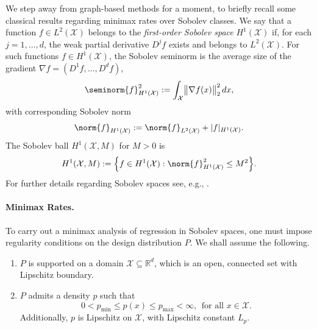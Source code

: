 \documentclass[twoside]{article}
\newcommand{\Reals}{\mathbb{R}}
\newcommand{\1}{\mathbf{1}}
\newcommand{\Rd}{\Reals^d}
\newcommand{\Xset}{\mathcal{X}}
\newcommand{\Leb}{L}
\theoremstyle{definition}
\theoremstyle{remark}
\begin{document}
We step away from graph-based methods for a moment, to briefly recall some classical results regarding minimax rates over Sobolev classes. We say that a function $f \in \Leb^2(\Xset)$ belongs to the \emph{first-order Sobolev space} $H^1(\Xset)$ if, for each $j = 1,\ldots,d$, the weak partial derivative $D^j f$ exists and belongs to $\Leb^2(\Xset)$. For such functions $f \in H^1(\Xset)$, the Sobolev seminorm \smash{$\seminorm{f}_{H^{1}(\Xset)}$} is the average size of the gradient $\nabla f = (D^1 f, \ldots, D^d f)$, 
\begin{equation*}
\seminorm{f}_{H^1(\Xset)}^2 := \int_{\Xset} \bigl\|\nabla f(x)\bigr\|_2^2 \,dx,
\end{equation*}
with corresponding Sobolev norm 
\begin{equation*}
\norm{f}_{H^1(\Xset)} := \norm{f}_{\Leb^2(\Xset)} + |f|_{H^1(\Xset)}.
\end{equation*}
The Sobolev ball $H^1(\Xset,M)$ for $M > 0$ is
\begin{equation*}
H^1(\Xset,M) := \Bigl\{f \in H^1(\Xset): \norm{f}_{H^1(\Xset)}^2 \leq M^2\Bigr\}.
\end{equation*}
For further details regarding Sobolev spaces see, e.g., \citet{evans10,leoni2017}.

\paragraph{Minimax Rates.}

To carry out a minimax analysis of regression in Sobolev spaces, one must impose regularity conditions on the design distribution $P$. We shall assume the following.
\begin{enumerate}[label=(P\arabic*)]
	\item
	\label{asmp:domain}
	$P$ is supported on a domain $\Xset \subseteq \Rd$, which is an open, connected set with Lipschitz boundary.
	\item
	\label{asmp:density} 
	$P$ admits a density $p$ such that
	\begin{equation*}
	0 < p_{\min} \leq p(x) \leq p_{\max} < \infty, ~~\textrm{for all $x \in \Xset$}.
	\end{equation*}
	Additionally, $p$ is Lipschitz on $\Xset$, with Lipschitz constant $L_p$.
\end{enumerate}
\end{document}
